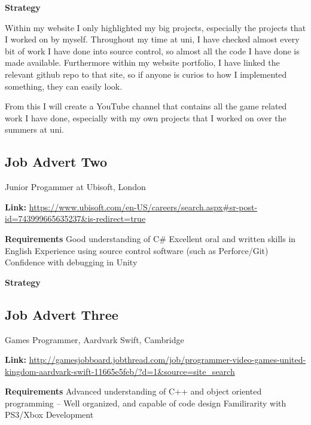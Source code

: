 \documentclass{scrartcl}
\begin{document}
\textbf{Strategy}

Within my website I only highlighted my big projects, especially the projects that I worked on by myself.
Throughout my time at uni, I have checked almost every bit of work I have done into source control, so almost all the code I have done is made available. Furthermore within my website portfolio, I have linked the relevant github repo to that site, so if anyone is curios to how I implemented something, they can easily look.

From this I will create a YouTube channel that contains all the game related work I have done, especially with my own projects that I worked on over the summers at uni.








\subsection{Job Advert Two}
Junior Progammer at Ubisoft, London

\textbf{Link:} \url{https://www.ubisoft.com/en-US/careers/search.aspx#sr-post-id=743999665635237&is-redirect=true}

\textbf{Requirements}
Good understanding of C\# 
Excellent oral and written skills in English
Experience using source control software (such as Perforce/Git)
Confidence with debugging in Unity

\textbf{Strategy}











\subsection{Job Advert Three}
Games Programmer, Aardvark Swift, Cambridge

\textbf{Link:}
\url{http://gamesjobboard.jobthread.com/job/programmer-video-games-united-kingdom-aardvark-swift-11665e5feb/?d=1&source=site_search}


\textbf{Requirements}
Advanced understanding of C++ and object oriented programming
– Well organized, and capable of code design
Familirarity with PS3/Xbox Development
\end{document}
